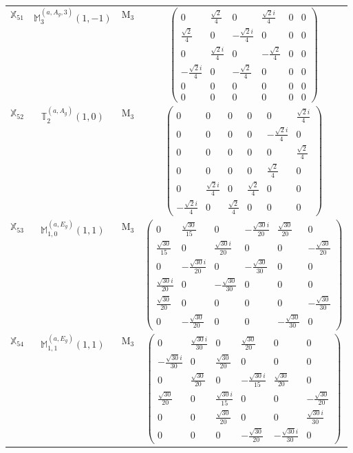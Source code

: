 \documentclass[fleqn,10pt,landscape]{article}
\begin{document}
\begin{itemize}
\begin{center}
\begin{longtable}{c|c|c|c}
$ \mathbb{X}_{51} $ & $\mathbb{M}_{3}^{(a,A_{g},3)}(1,-1)$ & M$_{3}$ & $\begin{pmatrix} 0 & \frac{\sqrt{2}}{4} & 0 & \frac{\sqrt{2} i}{4} & 0 & 0 \\ \frac{\sqrt{2}}{4} & 0 & - \frac{\sqrt{2} i}{4} & 0 & 0 & 0 \\ 0 & \frac{\sqrt{2} i}{4} & 0 & - \frac{\sqrt{2}}{4} & 0 & 0 \\ - \frac{\sqrt{2} i}{4} & 0 & - \frac{\sqrt{2}}{4} & 0 & 0 & 0 \\ 0 & 0 & 0 & 0 & 0 & 0 \\ 0 & 0 & 0 & 0 & 0 & 0 \end{pmatrix}$ \\
$ \mathbb{X}_{52} $ & $\mathbb{T}_{2}^{(a,A_{g})}(1,0)$ & M$_{3}$ & $\begin{pmatrix} 0 & 0 & 0 & 0 & 0 & \frac{\sqrt{2} i}{4} \\ 0 & 0 & 0 & 0 & - \frac{\sqrt{2} i}{4} & 0 \\ 0 & 0 & 0 & 0 & 0 & \frac{\sqrt{2}}{4} \\ 0 & 0 & 0 & 0 & \frac{\sqrt{2}}{4} & 0 \\ 0 & \frac{\sqrt{2} i}{4} & 0 & \frac{\sqrt{2}}{4} & 0 & 0 \\ - \frac{\sqrt{2} i}{4} & 0 & \frac{\sqrt{2}}{4} & 0 & 0 & 0 \end{pmatrix}$ \\
$ \mathbb{X}_{53} $ & $\mathbb{M}_{1,0}^{(a,E_{g})}(1,1)$ & M$_{3}$ & $\begin{pmatrix} 0 & \frac{\sqrt{30}}{15} & 0 & - \frac{\sqrt{30} i}{20} & \frac{\sqrt{30}}{20} & 0 \\ \frac{\sqrt{30}}{15} & 0 & \frac{\sqrt{30} i}{20} & 0 & 0 & - \frac{\sqrt{30}}{20} \\ 0 & - \frac{\sqrt{30} i}{20} & 0 & - \frac{\sqrt{30}}{30} & 0 & 0 \\ \frac{\sqrt{30} i}{20} & 0 & - \frac{\sqrt{30}}{30} & 0 & 0 & 0 \\ \frac{\sqrt{30}}{20} & 0 & 0 & 0 & 0 & - \frac{\sqrt{30}}{30} \\ 0 & - \frac{\sqrt{30}}{20} & 0 & 0 & - \frac{\sqrt{30}}{30} & 0 \end{pmatrix}$ \\
$ \mathbb{X}_{54} $ & $\mathbb{M}_{1,1}^{(a,E_{g})}(1,1)$ & M$_{3}$ & $\begin{pmatrix} 0 & \frac{\sqrt{30} i}{30} & 0 & \frac{\sqrt{30}}{20} & 0 & 0 \\ - \frac{\sqrt{30} i}{30} & 0 & \frac{\sqrt{30}}{20} & 0 & 0 & 0 \\ 0 & \frac{\sqrt{30}}{20} & 0 & - \frac{\sqrt{30} i}{15} & \frac{\sqrt{30}}{20} & 0 \\ \frac{\sqrt{30}}{20} & 0 & \frac{\sqrt{30} i}{15} & 0 & 0 & - \frac{\sqrt{30}}{20} \\ 0 & 0 & \frac{\sqrt{30}}{20} & 0 & 0 & \frac{\sqrt{30} i}{30} \\ 0 & 0 & 0 & - \frac{\sqrt{30}}{20} & - \frac{\sqrt{30} i}{30} & 0 \end{pmatrix}$ \\

\end{longtable}
\end{center}
\end{itemize}
\end{document}

